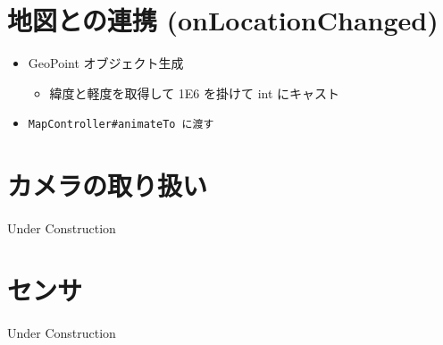 \documentclass[slide,papersize]{jsarticle}
\begin{document}
\section*{地図との連携 (onLocationChanged)}
\bigskip
\begin{itemize}
\item GeoPoint オブジェクト生成
 \begin{itemize}
 \item 緯度と軽度を取得して 1E6 を掛けて int にキャスト
 \end{itemize}
\bigskip
\item \begin{verbatim}MapController#animateTo に渡す\end{verbatim}
\end{itemize}

\section*{カメラの取り扱い}
Under Construction

\section*{センサ}
Under Construction
\end{document}
